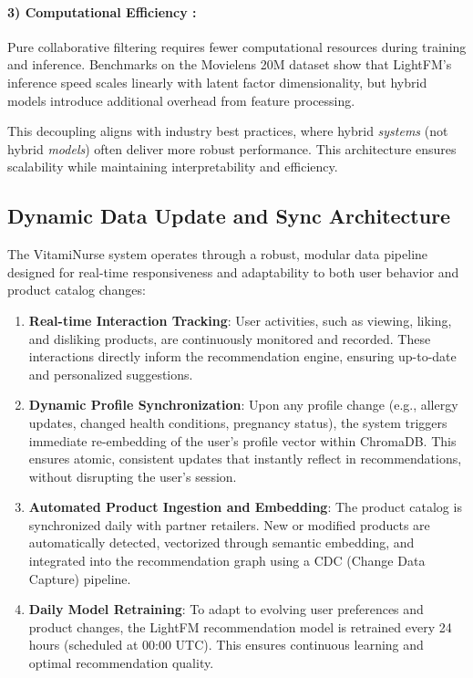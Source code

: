 \paragraph{3) Computational Efficiency :}
Pure collaborative filtering requires fewer computational resources during training and inference. Benchmarks on the Movielens 20M dataset show that LightFM's inference speed scales linearly with latent factor dimensionality, but hybrid models introduce additional overhead from feature processing.


This decoupling aligns with industry best practices, where hybrid \textit{systems} (not hybrid \textit{models}) often deliver more robust performance. This architecture ensures scalability while maintaining interpretability and efficiency.

\subsection{Dynamic Data Update and Sync Architecture}

The VitamiNurse system operates through a robust, modular data pipeline designed for real-time responsiveness and adaptability to both user behavior and product catalog changes:

\begin{enumerate}
    \item \textbf{Real-time Interaction Tracking}: User activities, such as viewing, liking, and disliking products, are continuously monitored and recorded. These interactions directly inform the recommendation engine, ensuring up-to-date and personalized  suggestions.
    
    \item \textbf{Dynamic Profile Synchronization}: Upon any profile change (e.g., allergy updates, changed health conditions, pregnancy status), the system triggers immediate re-embedding of the user's profile vector within ChromaDB. This ensures atomic, consistent updates that instantly reflect in recommendations, without disrupting the user's session.
    
    \item \textbf{Automated Product Ingestion and Embedding}: The product catalog is synchronized daily with partner retailers. New or modified products are automatically detected, vectorized through semantic embedding, and integrated into the recommendation graph using a CDC (Change Data Capture) pipeline.
    
    \item \textbf{Daily Model Retraining}: To adapt to evolving user preferences and product changes, the LightFM recommendation model is retrained every 24 hours (scheduled at 00:00 UTC). This ensures continuous learning and optimal recommendation quality.
\end{enumerate}


